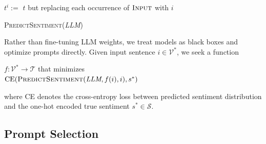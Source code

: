 \documentclass{article}
\theoremstyle{plain}
\theoremstyle{definition}
\theoremstyle{remark}
\begin{document}
\begin{algorithm}[h]

\vspace{1ex}
$t^{i} :=$ $t$ but replacing each occurrence of $\textsc{Input}$ with $i$\\

\vspace{-2ex}

\vspace{1ex}

\vspace{1ex}

\caption{\textsc{PredictSentiment(\textit{LLM})}}
\label{alg:PromptEvaluator}
\end{algorithm}

Rather than fine-tuning LLM weights, we treat models as black boxes and optimize prompts directly. Given input sentence $i\in\mathcal V^\ast$, we seek a function
\begin{center}
    $f : \mathcal{V}^\ast \to \mathcal T$ that minimizes\\
    $\text{CE}(\textsc{PredictSentiment}(\textit{LLM}, f(i), i), s^\ast)$
\end{center}
where CE denotes the cross-entropy loss between predicted sentiment distribution and the one-hot encoded true sentiment $s^\ast\in\mathcal S$.

\subsection{Prompt Selection}
\label{sec:promptSelection}
\end{document}
